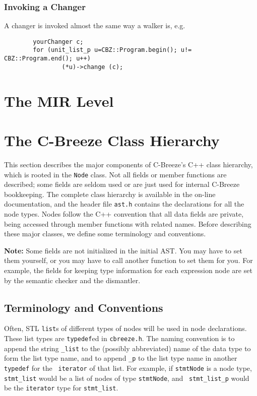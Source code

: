 \documentclass[10pt]{article}
\begin{document}
\subsubsection{Invoking a Changer}

A changer is invoked almost the same way a walker is, e.g.

\begin{small}
\begin{verbatim}
        yourChanger c;
        for (unit_list_p u=CBZ::Program.begin(); u!= CBZ::Program.end(); u++)
                (*u)->change (c);
\end{verbatim}
\end{small}


\section{The MIR Level}
\label{sec:MIR}




\section{The C-Breeze Class Hierarchy}
\label{sec:ClassHierarchy}

This section describes the major components of C-Breeze's C++ class
hierarchy, which is rooted in the {\tt Node} class.  Not all fields or member
functions are described; some fields are seldom used or are just used for
internal C-Breeze bookkeeping.  The complete class hierarchy is available in
the on-line documentation, and the header file {\tt ast.h} contains the
declarations for all the node types.  Nodes follow the C++ convention that
all data fields are private, being accessed through member functions with
related names.  Before describing these major classes, we define some
terminology and conventions.

{\bf Note:}  Some fields are not initialized in the initial AST.  You may 
have to set them yourself, or you may have to call another function
to set them for you.  For example, the fields for keeping type information 
for each expression node are set by the semantic checker and the dismantler.

\subsection{Terminology and Conventions}

Often, STL {\tt list}s of different types of nodes will be used in node
declarations.  These list types are {\tt typedef}ed in {\tt cbreeze.h}.  The
naming convention is to append the string {\tt \_list} to the (possibly
abbreviated) name of the data type to form the list type name, and to append
{\tt \_p} to the list type name in another {\tt typedef} for the {\tt
iterator} of that list.  For example, if {\tt stmtNode} is a node type, {\tt
stmt\_list} would be a list of nodes of type {\tt stmtNode}, and {\tt
stmt\_list\_p} would be the {\tt iterator} type for {\tt stmt\_list}.
\end{document}
